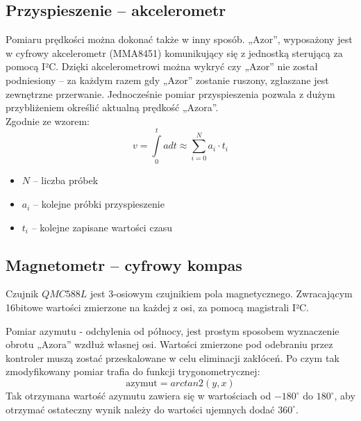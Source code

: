     \subsection{Przyspieszenie -- akcelerometr}
        \tab Pomiaru prędkości można dokonać także w inny sposób.
        „Azor”, wyposażony jest w cyfrowy akcelerometr (MMA8451) komunikujący się z jednostką sterującą za pomocą I²C.
        Dzięki akcelerometrowi można wykryć czy „Azor” nie został podniesiony -- za każdym razem gdy „Azor” zostanie ruszony, zgłaszane jest zewnętrzne przerwanie. 
        Jednocześnie pomiar przyspieszenia pozwala z dużym przybliżeniem określić aktualną prędkość „Azora”.\\
        Zgodnie ze wzorem:
        \begin{equation}
            v = \int\limits_{0}^{t} a dt \approx \sum_{i = 0}^{N} a_i \cdot t_i
        \end{equation}
        \begin{itemize}
            \item $N$ -- liczba próbek
            \item $a_i$ -- kolejne próbki przyspieszenie
            \item $t_i$ -- kolejne zapisane wartości czasu
        \end{itemize}

    \subsection{Magnetometr -- cyfrowy kompas}\label{section:measure:azimuth}
        \tab Czujnik $QMC588L$ jest 3-osiowym czujnikiem pola magnetycznego. Zwracającym 16bitowe wartości zmierzone na każdej z osi, za pomocą magistrali I²C.
        
        Pomiar azymutu - odchylenia od północy, jest prostym sposobem wyznaczenie obrotu „Azora” wzdłuż własnej osi.
        Wartości zmierzone pod odebraniu przez kontroler muszą zostać przeskalowane w celu eliminacji zakłóceń.
        Po czym tak zmodyfikowany pomiar trafia do  funkcji trygonometrycznej:
        \begin{equation}
            \text{azymut} = arctan2(y, x)
        \end{equation}
        Tak otrzymana wartość azymutu zawiera się w wartościach od $-180^\circ$ do $180^\circ$, aby otrzymać ostateczny wynik należy do wartości ujemnych dodać $360^\circ$.
